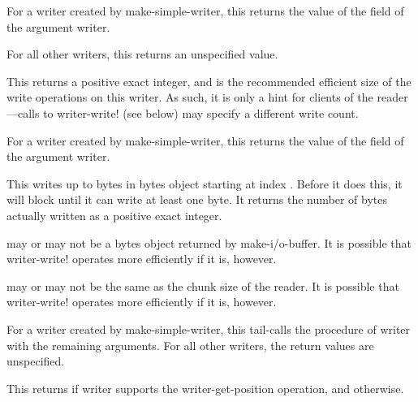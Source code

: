 \begin{entry}{%
}
   
  For a writer created by {\cf make-simple-writer}, this returns the value of the
   field of the argument writer.
  
  For all other writers, this returns an unspecified value.
\end{entry}

\begin{entry}{%
}
   
This returns a positive exact integer, and is the recommended efficient
size of the write operations on this writer. As such, it is only a hint for
clients of the reader---calls to {\cf writer-write!} (see below) may specify a
different write count.

For a writer created by {\cf make-simple-writer}, this returns the value of the
 field of the argument writer.
\end{entry}

\begin{entry}{%
}
   
This writes up to  bytes in bytes object 
starting at index . Before it does this, it will block
until it can write at least one byte. It returns the number of bytes
actually written as a positive exact integer.
   
 may or may not be a bytes object returned by {\cf
  make-i/o-buffer}. It is possible that {\cf writer-write!} operates
more efficiently if it is, however.

 may or may not be the same as the chunk size of the reader. It is
possible that {\cf writer-write!} operates more efficiently if it is, however.

For a writer created by {\cf make-simple-writer}, this tail-calls the
 procedure of writer with the remaining arguments.  For
all other writers, the return values are unspecified.
\end{entry}   

\begin{entry}{%
}
   
This returns \schtrue{} if writer supports the {\cf
  writer-get-position} operation, and \schfalse{} otherwise.
\end{entry}   

